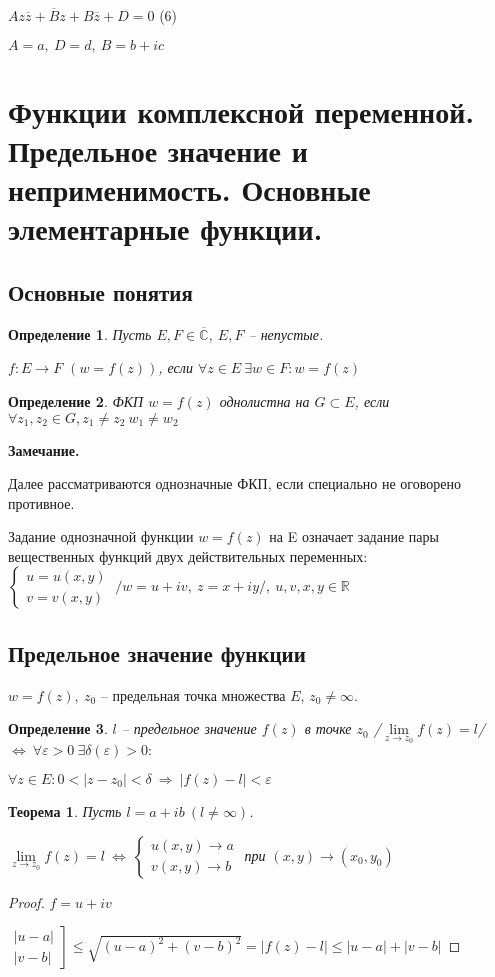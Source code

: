 \documentclass[final]{report}
\newcommand{\then}{\ \Rightarrow\ }
\newcommand{\R}{\mathbb{R}}
\renewcommand{\C}{\mathbb{C}}
\newcommand{\mlim}[1]{\underset{#1}{\lim}}
\newcommand{\LRA}{\Leftrightarrow}
\renewcommand{\bar}{\overline}
\newcommand{\e}{\varepsilon}
\newcommand{\z}{\bar{z}}
\newcommand{\CC}{\bar{\C}}
\newcommand{\sys}[1]{\left\{\begin{matrix}#1\end{matrix}\right.}
\newcommand{\opr}[1]{\begin{opred}#1\end{opred}}
\newtheorem*{theor}{Теорема}
\newtheorem*{opred}{Определение}
\theoremstyle{remark}
\begin{document}
$Az\z+\bar{B}z+B\z+D=0$ (6)

$A=a,\ D=d,\ B=b+ic$

\newpage

\section{Функции комплексной переменной. Предельное значение и неприменимость. Основные элементарные функции.}

\subsection{Основные понятия}

\opr{Пусть $E,F\in\CC$, $E,F$ -- непустые.

$f\colon E\to F$ $(w=f(z))$, если $\forall z\in E\ \exists w\in F\colon w=f(z)$}

\opr{ФКП $w=f(z)$ однолистна на $G\subset E$, если $\forall z_1,z_2\in G,z_1\neq z_2\ w_1\neq w_2$}

{\bfseries Замечание.}

Далее рассматриваются однозначные ФКП, если специально не оговорено противное.

Задание однозначной функции $w=f(z)$ на E означает задание пары вещественных функций двух действительных переменных: $\sys{u=u(x,y)\\v=v(x,y)}\ /w=u+iv,\ z=x+iy/,\ u,v,x,y\in\R$

\subsection{Предельное значение функции}

$w=f(z),\ z_0$ -- предельная точка множества $E$, $z_0\neq\infty$.

\opr{$l$ -- предельное значение $f(z)$ в точке $z_0$ /$\mlim{z\to z_0}f(z)=l$/ $\LRA\ \forall\e>0\ \exists\delta(\e)>0\colon$

$\forall z\in E\colon 0<|z-z_0|<\delta \then |f(z)-l|<\e$}

\begin{theor}
Пусть $l=a+ib\ (l\neq\infty)$.

$\mlim{z\to z_0}f(z)=l\ \LRA\ \sys{u(x,y)\to a \\ v(x,y)\to b}$ при $(x,y)\to(x_0,y_0)$
\end{theor}

\begin{proof}
$f=u+iv$

$\left.\begin{matrix}|u-a|\\|v-b|\end{matrix}\right]\leq\sqrt{(u-a)^2+(v-b)^2}=|f(z)-l|\leq|u-a|+|v-b|$
\end{proof}
\end{document}
